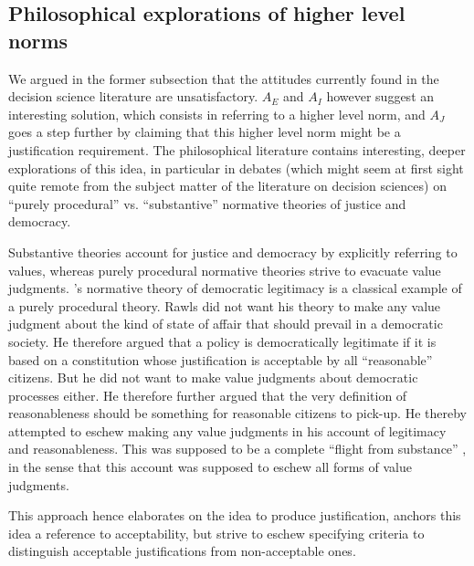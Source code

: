 \documentclass[preprint, french, english, 11pt, authoryear]{elsarticle}%
\begin{document}
\subsection{Philosophical explorations of higher level norms}
\label{sec:higher}
We argued in the former subsection that the attitudes currently found in the decision science literature are unsatisfactory. 
$A_E$ and $A_I$ however suggest an interesting solution, which consists in referring to a higher level norm, and $A_J$ goes a step further by claiming that this higher level norm might be a justification requirement. 
The philosophical literature contains interesting, deeper explorations of this idea, in particular in debates (which might seem at first sight quite remote from the subject matter of the literature on decision sciences) on “purely procedural” vs. “substantive” normative theories of justice and democracy.

Substantive theories account for justice and democracy by explicitly referring to values, whereas purely procedural normative theories strive to evacuate value judgments. 
\cite{rawls_political_2005}'s normative theory of democratic legitimacy is a classical example of a purely procedural theory. 
Rawls did not want his theory to make any value judgment about the kind of state of affair that should prevail in a democratic society. 
He therefore argued that a policy is democratically legitimate if it is based on a constitution whose justification is acceptable by all  “reasonable” citizens. 
But he did not want to make value judgments about democratic processes either. He therefore further argued that the very definition of reasonableness should be something for reasonable citizens to pick-up. 
He thereby attempted to eschew making any value judgments in his account of legitimacy and reasonableness. 
This was supposed to be a complete ``flight from substance'' \citep{estlund_democratic_2009}, in the sense that this account was supposed to eschew all forms of value judgments.

This approach hence elaborates on the idea to produce justification, anchors this idea a reference to acceptability, but strive to eschew specifying criteria to distinguish acceptable justifications from non-acceptable ones.
\end{document}

